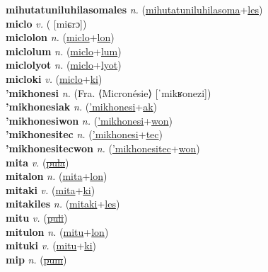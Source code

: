 \textbf{mihutatuniluhilasomales} \textit{n.} (\hyperref[mihutatuniluhilasoma]{mihutatuniluhilasoma}+\hyperref[les]{les})
 \label{mihutatuniluhilasomales} \\
\textbf{miclo} \textit{v.} ( [miɕrɔ])
 \label{miclo} \\
\textbf{miclolon} \textit{n.} (\hyperref[miclo]{miclo}+\hyperref[lon]{lon})
 \label{miclolon} \\
\textbf{miclolum} \textit{n.} (\hyperref[miclo]{miclo}+\hyperref[lum]{lum})
 \label{miclolum} \\
\textbf{miclolyot} \textit{n.} (\hyperref[miclo]{miclo}+\hyperref[lyot]{lyot})
 \label{miclolyot} \\
\textbf{micloki} \textit{v.} (\hyperref[miclo]{miclo}+\hyperref[ki]{ki})
 \label{micloki} \\
\textbf{'mikhonesi} \textit{n.} (Fra. ⟨Micronésie⟩ [ˈmikʁonezi])
 \label{'mikhonesi} \\
\textbf{'mikhonesiak} \textit{n.} (\hyperref['mikhonesi]{'mikhonesi}+\hyperref[ak]{ak})
 \label{'mikhonesiak} \\
\textbf{'mikhonesiwon} \textit{n.} (\hyperref['mikhonesi]{'mikhonesi}+\hyperref[won]{won})
 \label{'mikhonesiwon} \\
\textbf{'mikhonesitec} \textit{n.} (\hyperref['mikhonesi]{'mikhonesi}+\hyperref[tec]{tec})
 \label{'mikhonesitec} \\
\textbf{'mikhonesitecwon} \textit{n.} (\hyperref['mikhonesitec]{'mikhonesitec}+\hyperref[won]{won})
 \label{'mikhonesitecwon} \\
\textbf{mita} \textit{v.} (\hyperref[pula]{\sout{pula}})
 \label{mita} \\
\textbf{mitalon} \textit{n.} (\hyperref[mita]{mita}+\hyperref[lon]{lon})
 \label{mitalon} \\
\textbf{mitaki} \textit{v.} (\hyperref[mita]{mita}+\hyperref[ki]{ki})
 \label{mitaki} \\
\textbf{mitakiles} \textit{n.} (\hyperref[mitaki]{mitaki}+\hyperref[les]{les})
 \label{mitakiles} \\
\textbf{mitu} \textit{v.} (\hyperref[puli]{\sout{puli}})
 \label{mitu} \\
\textbf{mitulon} \textit{n.} (\hyperref[mitu]{mitu}+\hyperref[lon]{lon})
 \label{mitulon} \\
\textbf{mituki} \textit{v.} (\hyperref[mitu]{mitu}+\hyperref[ki]{ki})
 \label{mituki} \\
\textbf{mip} \textit{n.} (\hyperref[pum]{\sout{pum}})
 \label{mip} \\
